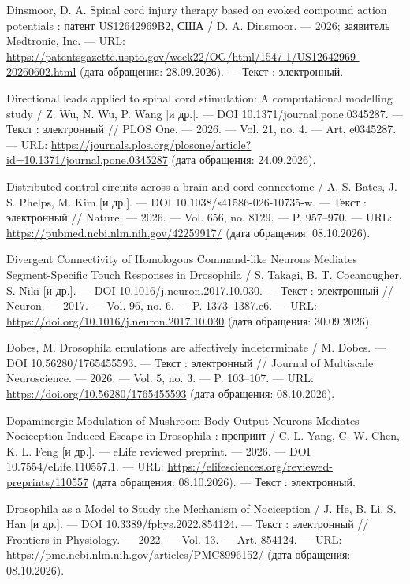 \begin{list}{}{\setlength{\leftmargin}{10mm}\setlength{\labelwidth}{8mm}\setlength{\labelsep}{2mm}\setlength{\itemsep}{0pt}\setlength{\parsep}{0pt}\setlength{\topsep}{0pt}}
\item[90.] Dinsmoor, D. A. Spinal cord injury therapy based on evoked compound action potentials : патент US12642969B2, США / D. A. Dinsmoor. — 2026; заявитель Medtronic, Inc. — URL: \url{https://patentsgazette.uspto.gov/week22/OG/html/1547-1/US12642969-20260602.html} (дата обращения: 28.09.2026). — Текст : электронный.
\item[91.] Directional leads applied to spinal cord stimulation: A computational modelling study / Z. Wu, N. Wu, P. Wang [и др.]. — DOI 10.1371/journal.pone.0345287. — Текст : электронный // PLOS One. — 2026. — Vol. 21, no. 4. — Art. e0345287. — URL: \url{https://journals.plos.org/plosone/article?id=10.1371/journal.pone.0345287} (дата обращения: 24.09.2026).
\item[92.] Distributed control circuits across a brain-and-cord connectome / A. S. Bates, J. S. Phelps, M. Kim [и др.]. — DOI 10.1038/s41586-026-10735-w. — Текст : электронный // Nature. — 2026. — Vol. 656, no. 8129. — P. 957–970. — URL: \url{https://pubmed.ncbi.nlm.nih.gov/42259917/} (дата обращения: 08.10.2026).
\item[93.] Divergent Connectivity of Homologous Command-like Neurons Mediates Segment-Specific Touch Responses in Drosophila / S. Takagi, B. T. Cocanougher, S. Niki [и др.]. — DOI 10.1016/j.neuron.2017.10.030. — Текст : электронный // Neuron. — 2017. — Vol. 96, no. 6. — P. 1373–1387.e6. — URL: \url{https://doi.org/10.1016/j.neuron.2017.10.030} (дата обращения: 30.09.2026).
\item[94.] Dobes, M. Drosophila emulations are affectively indeterminate / M. Dobes. — DOI 10.56280/1765455593. — Текст : электронный // Journal of Multiscale Neuroscience. — 2026. — Vol. 5, no. 3. — P. 103–107. — URL: \url{https://doi.org/10.56280/1765455593} (дата обращения: 08.10.2026).
\item[95.] Dopaminergic Modulation of Mushroom Body Output Neurons Mediates Nociception-Induced Escape in Drosophila : препринт / C. L. Yang, C. W. Chen, K. L. Feng [и др.]. — eLife reviewed preprint. — 2026. — DOI 10.7554/eLife.110557.1. — URL: \url{https://elifesciences.org/reviewed-preprints/110557} (дата обращения: 08.10.2026). — Текст : электронный.
\item[96.] Drosophila as a Model to Study the Mechanism of Nociception / J. He, B. Li, S. Han [и др.]. — DOI 10.3389/fphys.2022.854124. — Текст : электронный // Frontiers in Physiology. — 2022. — Vol. 13. — Art. 854124. — URL: \url{https://pmc.ncbi.nlm.nih.gov/articles/PMC8996152/} (дата обращения: 08.10.2026).

\end{list}

